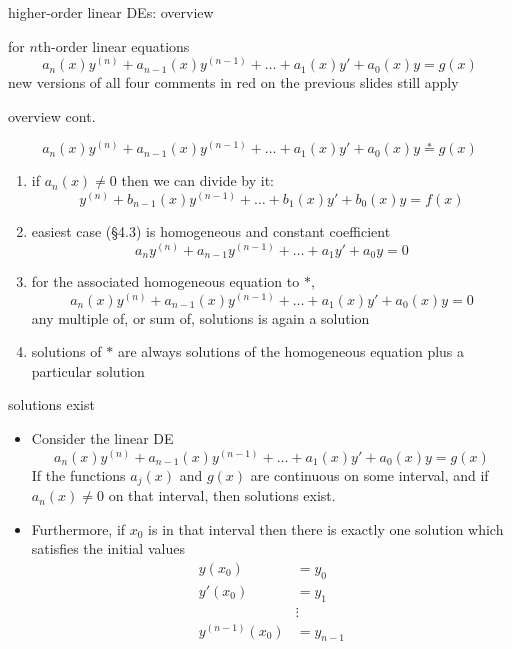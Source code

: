 \documentclass{beamer}
\begin{document}
\begin{frame}{higher-order linear DEs: overview}

for $n$th-order linear equations
\begin{equation*}
    a_n(x) y^{(n)} + a_{n-1}(x) y^{(n-1)} + \dots + a_1(x) y' + a_0(x) y = g(x)
\end{equation*}
\alert{new versions of all four comments in red on the previous slides still apply}
\end{frame}


\begin{frame}{overview cont.}

\begin{equation*}
    a_n(x) y^{(n)} + a_{n-1}(x) y^{(n-1)} + \dots + a_1(x) y' + a_0(x) y \stackrel{\ast}{=} g(x)
\end{equation*}
\begin{enumerate}
\item if $a_n(x)\ne 0$ then we can divide by it:
    $$y^{(n)} + b_{n-1}(x) y^{(n-1)} + \dots + b_1(x) y' + b_0(x) y = f(x)$$
\item easiest case (\S4.3) is homogeneous and constant coefficient
    $$a_n y^{(n)} + a_{n-1} y^{(n-1)} + \dots + a_1 y' + a_0 y = 0$$
\item for the associated homogeneous equation to $\ast$,
\begin{equation*}
    a_n(x) y^{(n)} + a_{n-1}(x) y^{(n-1)} + \dots + a_1(x) y' + a_0(x) y = 0
\end{equation*}
any multiple of, or sum of, solutions is again a solution
\item solutions of $\ast$ are always solutions of the homogeneous equation plus a particular solution
\end{enumerate}
\end{frame}


\begin{frame}{solutions exist}

\begin{theorem}  
\begin{itemize}
\item Consider the linear DE
\begin{equation*}
    a_n(x) y^{(n)} + a_{n-1}(x) y^{(n-1)} + \dots + a_1(x) y' + a_0(x) y = g(x)
\end{equation*}
If the functions $a_j(x)$ and $g(x)$ are continuous on some interval, and if $a_n(x) \ne 0$ on that interval, then solutions exist.
\item Furthermore, if $x_0$ is in that interval then there is exactly one solution which satisfies the initial values
\begin{align*}
y(x_0) &= y_0 \\
y'(x_0) &= y_1 \\
 &\vdots \\
y^{(n-1)}(x_0) &= y_{n-1}
\end{align*}
\end{itemize}
\end{theorem}
\end{frame}
\end{document}
